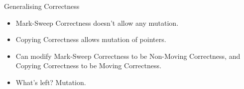 \documentclass[usenames,dvipsnames]{beamer}
\begin{document}
\begin{frame}{Generalising Correctness}
  \begin{itemize}
  \item Mark-Sweep Correctness doesn't allow any mutation.
  \item Copying Correctness allows mutation of pointers.
  \item Can modify Mark-Sweep Correctness to be Non-Moving
    Correctness, and Copying Correctness to be Moving Correctness.
  \item What's left? Mutation.
  \end{itemize}






\end{frame}
\end{document}
